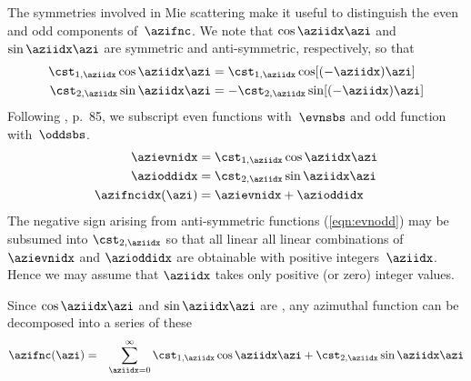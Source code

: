 \documentclass[12pt]{article}
\begin{document}
The symmetries involved in Mie scattering make it useful to
distinguish the even and odd components of~$\azifnc$. 
We note that $\cos\aziidx\azi$ and $\sin\aziidx\azi$ are symmetric and 
anti-symmetric, respectively, so that
\begin{subequations}
\begin{align}
\cst_{1,\aziidx}\cos\aziidx\azi & = \cst_{1,\aziidx}\cos[(-\aziidx)\azi] \\
\cst_{2,\aziidx}\sin\aziidx\azi & = -\cst_{2,\aziidx}\sin[(-\aziidx)\azi]
\label{eqn:evnodd}
\end{align}
\end{subequations}
Following \cite{BoH83}, p.~85, we subscript even functions
with~$\evnsbs$ and odd function with~$\oddsbs$. 
\begin{subequations}
\begin{align}
\azievnidx & = \cst_{1,\aziidx}\cos\aziidx\azi \nonumber \\
\azioddidx & = \cst_{2,\aziidx}\sin\aziidx\azi \nonumber \\
\azifncidx(\azi) & = \azievnidx + \azioddidx
\label{eqn:wvn_eqn_sph_azi_sln_evn_odd}
\end{align}
\end{subequations}
The negative sign arising from anti-symmetric functions 
(\ref{eqn:evnodd}) may be subsumed into $\cst_{2,\aziidx}$ so that all
linear all linear combinations of $\azievnidx$ and $\azioddidx$ are
obtainable with positive integers~$\aziidx$.
Hence we may assume that $\aziidx$ takes only positive (or zero)
integer values.

Since $\cos\aziidx\azi$ and $\sin\aziidx\azi$ are
, any azimuthal function can be decomposed into 
a series of these 
\begin{eqnarray}
\azifnc(\azi) & = & \sum_{\aziidx=0}^{\infty} 
\cst_{1,\aziidx}\cos\aziidx\azi + \cst_{2,\aziidx}\sin\aziidx\azi
\label{eqn:wvn_eqn_sph_azi_sln_cst}
\end{eqnarray}
\end{document}
